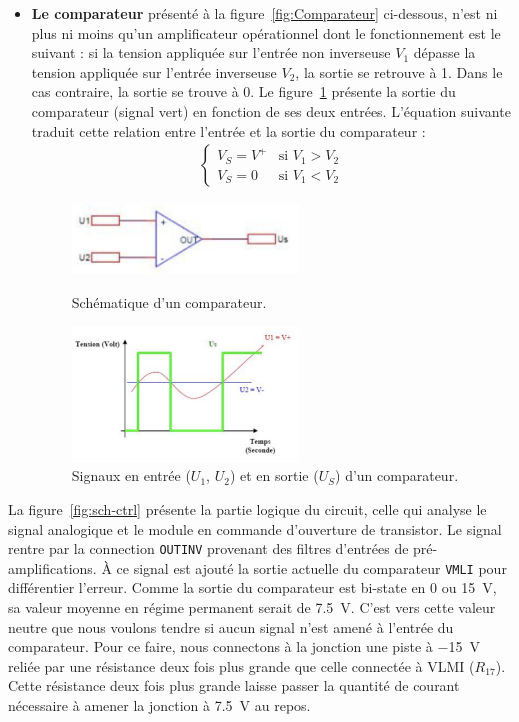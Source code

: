 \documentclass[10pt, oneside, a4paper]{article}
\begin{document}
\begin{itemize}
\item \noindent\textbf{Le comparateur} présenté à la figure~\ref{fig:Comparateur} ci-dessous, n'est ni plus ni moins qu'un amplificateur opérationnel dont le fonctionnement est le suivant : si la tension appliquée sur l'entrée non inverseuse $V_{1}$ dépasse la tension appliquée sur l'entrée inverseuse $V_{2}$, la sortie se retrouve à 1.
Dans le cas contraire, la sortie se trouve à 0.
Le figure~\ref{fig:Comparateur_Graphe} présente la sortie du comparateur (signal vert) en fonction de ses deux entrées.
L'équation suivante traduit cette relation entre l'entrée et la sortie du comparateur : 
\begin{align}
\begin{cases}
 V_{S} = V^{+} &\text{si } V_{1} > V_{2} \\
 V_{S} = 0     &\text{si } V_{1} < V_{2}
\end{cases}
\end{align}
\begin{figure}[!ht]
	\centering
	\includegraphics[width=6cm]{image/comparateur.png}
	\caption{Schématique d'un comparateur.}
	\label{fig:Comparateur}
	\centering
	\includegraphics[width=6cm]{image/Graphe_Comparateur.png}
	\caption{Signaux en entrée ($U_1$, $U_2$) et en sortie ($U_S$) d'un comparateur.}
	\label{fig:Comparateur_Graphe}
\end{figure}
\end{itemize}
La figure~\ref{fig:sch-ctrl} présente la partie logique du circuit, celle qui analyse le signal analogique et le module en commande d'ouverture de transistor.
Le signal rentre par la connection \texttt{OUTINV} provenant des filtres d'entrées de pré-amplifications.
À ce signal est ajouté la sortie actuelle du comparateur \texttt{VMLI} pour différentier l'erreur.
Comme la sortie du comparateur est bi-state en 0 ou \SI{15}{\volt}, sa valeur moyenne en régime permanent serait de \SI{7.5}{\volt}.
C'est vers cette valeur \og{}neutre\fg{} que nous voulons tendre si aucun signal n'est amené à l'entrée du comparateur.
Pour ce faire, nous connectons à la jonction une piste à \SI{-15}{\volt} reliée par une résistance deux fois plus grande que celle connectée à VLMI ($R_{17}$).
Cette résistance deux fois plus grande laisse passer la quantité de courant nécessaire à amener la jonction à \SI{7.5}{\volt} au repos.
\end{document}

